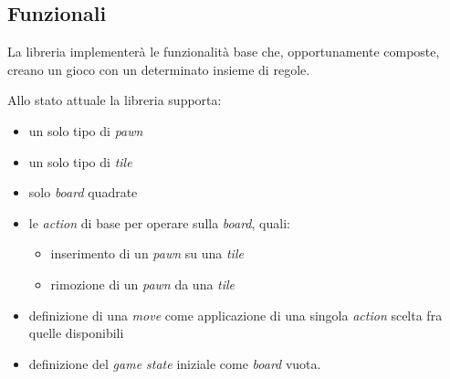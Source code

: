 
\subsection{Funzionali}

La libreria implementerà le funzionalità base che, opportunamente composte, creano un gioco con un determinato insieme di regole.

Allo stato attuale la libreria supporta:

\begin{itemize}
    \item un solo tipo di \textit{pawn}
    \item un solo tipo di \textit{tile}
    \item solo \textit{board} quadrate
    \item le \textit{action} di base per operare sulla \textit{board}, quali:
    \begin{itemize}
        \item inserimento di un \textit{pawn} su una \textit{tile}
        \item rimozione di un \textit{pawn} da una \textit{tile}
    \end{itemize}
    \item definizione di una \textit{move} come applicazione di una singola \textit{action} scelta fra quelle disponibili
    \item definizione del \textit{game state} iniziale come \textit{board} vuota.
\end{itemize}

